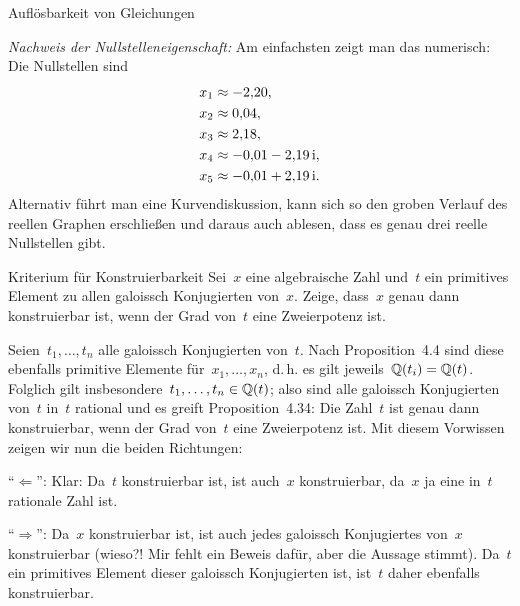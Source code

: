 \documentclass{algblatt}
\begin{document}
\begin{aufgabe}{Auflösbarkeit von Gleichungen}
\begin{loesungE}
\emph{Nachweis der Nullstelleneigenschaft:} Am einfachsten zeigt man das
numerisch: Die Nullstellen sind
\begin{align*}
  x_1 &\approx -2{,}20, \\
  x_2 &\approx 0{,}04, \\
  x_3 &\approx 2{,}18, \\
  x_4 &\approx -0{,}01 - 2{,}19\,\mathrm{i}, \\
  x_5 &\approx -0{,}01 + 2{,}19\,\mathrm{i}.
\end{align*}
Alternativ führt man eine Kurvendiskussion, kann sich so den groben Verlauf des
reellen Graphen erschließen und daraus auch ablesen, dass es genau drei reelle
Nullstellen gibt.
\end{loesungE}
\end{aufgabe}

\begin{aufgabe}{Kriterium für Konstruierbarkeit}
Sei~$x$ eine algebraische Zahl und~$t$ ein primitives Element zu allen galoissch
Konjugierten von~$x$. Zeige, dass~$x$ genau dann konstruierbar ist, wenn der
Grad von~$t$ eine Zweierpotenz ist.

\begin{loesung}
Seien~$t_1,\ldots,t_n$ alle galoissch Konjugierten von~$t$. Nach
Proposition~4.4 sind diese ebenfalls primitive Elemente für~$x_1,\ldots,x_n$,
d.\,h. es gilt jeweils~$\mathbb{Q}(t_i) = \mathbb{Q}(t)$. Folglich gilt
insbesondere~$t_1,\ldots,t_n \in \mathbb{Q}(t)$; also sind alle galoissch Konjugierten
von~$t$ in~$t$ rational und es greift Proposition~4.34: Die Zahl~$t$ ist genau
dann konstruierbar, wenn der Grad von~$t$ eine Zweierpotenz ist.
Mit diesem Vorwissen zeigen wir nun die beiden Richtungen:

"`$\Longleftarrow$"': Klar: Da~$t$ konstruierbar ist, ist auch~$x$
konstruierbar, da~$x$ ja eine in~$t$ rationale Zahl ist.

"`$\Longrightarrow$"': Da~$x$ konstruierbar ist, ist auch jedes galoissch
Konjugiertes von~$x$ konstruierbar (wieso?! Mir fehlt ein Beweis dafür, aber
die Aussage stimmt). Da~$t$
ein primitives Element dieser galoissch Konjugierten ist, ist~$t$ daher
ebenfalls konstruierbar.
\end{loesung}
\end{aufgabe}
\end{document}
